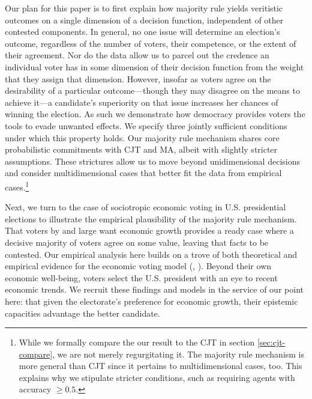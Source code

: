 \documentclass[11pt]{article}
\begin{document}
Our plan for this paper is to first explain how majority rule
yields veritistic outcomes on a single dimension of a decision
function, independent of other contested components.
In general, no one issue will determine an election's outcome, regardless of the number of voters, their competence, or the extent of their agreement. Nor do the data allow us to parcel out the credence an individual voter has in some dimension of their decision function from the weight that they assign that dimension.
However, insofar as voters agree on the desirability of a particular outcome---though they may disagree on the means to achieve it---a candidate's superiority on that issue increases her chances of winning the election. As such we demonstrate how democracy provides voters the tools to evade unwanted effects.
We specify three jointly sufficient conditions under which this property holds.
Our majority rule mechanism shares  core probabilistic commitments with CJT and MA, albeit with slightly stricter assumptions. These strictures allow us to move beyond unidimensional decisions and consider multidimensional cases that better fit the data from empirical cases.\footnote{While we formally compare the our result to the CJT in section \ref{sec:cjt-compare}, we are not merely regurgitating it. The majority rule mechanism is more general than CJT since it pertains to multidimensional cases, too. This explains why we stipulate stricter conditions, such as requiring agents with accuracy $\ge 0.5$. }

Next, we turn to the case of sociotropic economic voting in U.S. presidential elections to illustrate the empirical plausibility of the majority rule mechanism. That voters by and large want economic growth provides a ready case where a decisive majority of voters agree on some value, leaving that facts to be contested.
 Our empirical analysis here builds on a trove of both theoretical and empirical evidence for the economic voting model (\cite{Duch2008}, \cite{Revisited09}). Beyond their own economic well-being, voters select the U.S. president with an eye to recent economic trends. We recruit these findings and models in the service of our point here: that given the electorate's preference for economic growth, their epistemic capacities advantage the better candidate.


\end{document}
